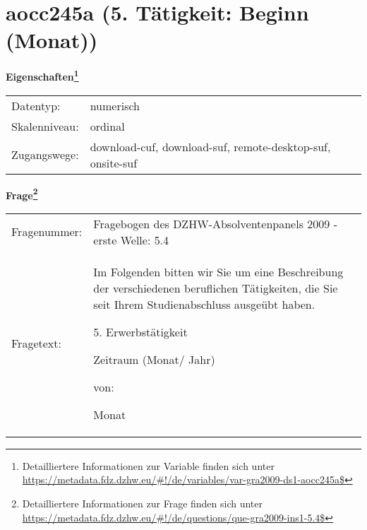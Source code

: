 
    \setcounter{footnote}{0}

    \vspace*{-1.8cm}
	\section{aocc245a (5. Tätigkeit: Beginn (Monat))}
	\label{section:aocc245a}



    \vspace*{0.5cm}
    \noindent\textbf{Eigenschaften\footnote{Detailliertere Informationen zur Variable finden sich unter
		\url{https://metadata.fdz.dzhw.eu/\#!/de/variables/var-gra2009-ds1-aocc245a$}}}\\
	\begin{tabularx}{\hsize}{@{}lX}
	Datentyp: & numerisch \\
	Skalenniveau: & ordinal \\
	Zugangswege: &
	  download-cuf, 
	  download-suf, 
	  remote-desktop-suf, 
	  onsite-suf
 \\
    \end{tabularx}



				\vspace*{0.5cm}
                \noindent\textbf{Frage\footnote{Detailliertere Informationen zur Frage finden sich unter
		              \url{https://metadata.fdz.dzhw.eu/\#!/de/questions/que-gra2009-ins1-5.4$}}}\\
				\begin{tabularx}{\hsize}{@{}lX}
					Fragenummer: &
					  Fragebogen des DZHW-Absolventenpanels 2009 - erste Welle:
					  5.4
 \\
					Fragetext: & Im Folgenden bitten wir Sie um eine Beschreibung der verschiedenen beruflichen Tätigkeiten, die Sie seit Ihrem Studienabschluss ausgeübt haben.\par  5. Erwerbstätigkeit\par  Zeitraum (Monat/ Jahr)\par  von:\par  Monat \\
				\end{tabularx}





